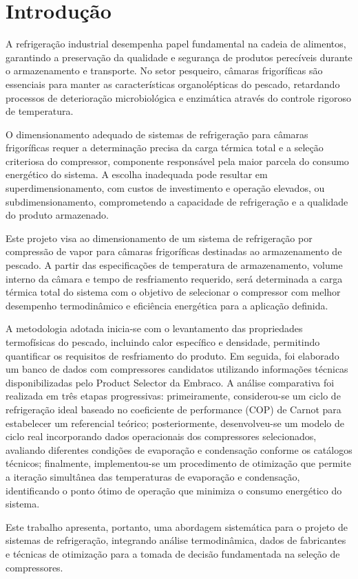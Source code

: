 
\chapter{Introdução}

A refrigeração industrial desempenha papel fundamental na cadeia de alimentos, garantindo a preservação da qualidade e segurança de produtos perecíveis durante o armazenamento e transporte. No setor pesqueiro, câmaras frigoríficas são essenciais para manter as características organolépticas do pescado, retardando processos de deterioração microbiológica e enzimática através do controle rigoroso de temperatura.

O dimensionamento adequado de sistemas de refrigeração para câmaras frigoríficas requer a determinação precisa da carga térmica total e a seleção criteriosa do compressor, componente responsável pela maior parcela do consumo energético do sistema. A escolha inadequada pode resultar em superdimensionamento, com custos de investimento e operação elevados, ou subdimensionamento, comprometendo a capacidade de refrigeração e a qualidade do produto armazenado.

Este projeto visa ao dimensionamento de um sistema de refrigeração por compressão de vapor para câmaras frigoríficas destinadas ao armazenamento de pescado. A partir das especificações de temperatura de armazenamento, volume interno da câmara e tempo de resfriamento requerido, será determinada a carga térmica total do sistema com o objetivo de selecionar o compressor com melhor desempenho termodinâmico e eficiência energética para a aplicação definida.

A metodologia adotada inicia-se com o levantamento das propriedades termofísicas do pescado, incluindo calor específico e densidade, permitindo quantificar os requisitos de resfriamento do produto. Em seguida, foi elaborado um banco de dados com compressores candidatos utilizando informações técnicas disponibilizadas pelo Product Selector da Embraco. A análise comparativa foi realizada em três etapas progressivas: primeiramente, considerou-se um ciclo de refrigeração ideal baseado no coeficiente de performance (COP) de Carnot para estabelecer um referencial teórico; posteriormente, desenvolveu-se um modelo de ciclo real incorporando dados operacionais dos compressores selecionados, avaliando diferentes condições de evaporação e condensação conforme os catálogos técnicos; finalmente, implementou-se um procedimento de otimização que permite a iteração simultânea das temperaturas de evaporação e condensação, identificando o ponto ótimo de operação que minimiza o consumo energético do sistema.

Este trabalho apresenta, portanto, uma abordagem sistemática para o projeto de sistemas de refrigeração, integrando análise termodinâmica, dados de fabricantes e técnicas de otimização para a tomada de decisão fundamentada na seleção de compressores.